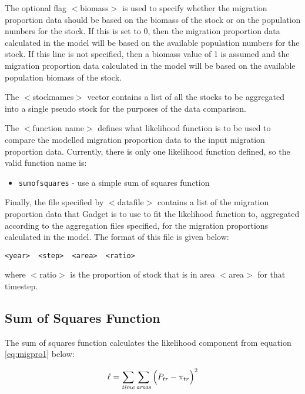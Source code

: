 \documentclass[]{book}
\providecommand{\tightlist}{%
  \setlength{\itemsep}{0pt}\setlength{\parskip}{0pt}}
\begin{document}
The optional flag \(<\)biomass\(>\) is used to specify whether the migration
proportion data should be based on the biomass of the stock or on the
population numbers for the stock. If this is set to 0, then the
migration proportion data calculated in the model will be based on the
available population numbers for the stock. If this line is not
specified, then a biomass value of 1 is assumed and the migration
proportion data calculated in the model will be based on the available
population biomass of the stock.

The \(<\)stocknames\(>\) vector contains a list of all the stocks to be
aggregated into a single pseudo stock for the purposes of the data
comparison.

The \(<\)function name\(>\) defines what likelihood function is to be used
to compare the modelled migration proportion data to the input migration
proportion data. Currently, there is only one likelihood function
defined, so the valid function name is:

\begin{itemize}
\tightlist
\item
  \texttt{sumofsquares} - use a simple sum of squares function
\end{itemize}

Finally, the file specified by \(<\)datafile\(>\) contains a list of the
migration proportion data that Gadget is to use to fit the likelihood
function to, aggregated according to the aggregation files specified,
for the migration proportions calculated in the model. The format of
this file is given below:

\begin{verbatim}
<year>  <step>  <area>  <ratio>
\end{verbatim}

where \(<\)ratio\(>\) is the proportion of stock that is in area \(<\)area\(>\)
for that timestep.

\hypertarget{sum-of-squares-function-2}{%
\subsection{Sum of Squares Function}\label{sum-of-squares-function-2}}

The sum of squares function calculates the likelihood component from
equation \eqref{eq:migpro1} below:

\begin{equation}
\label{eq:migpro1}
\ell = \sum_{\it time}\sum_{\it areas} \Big( P_{tr} - \pi_{tr} \Big) ^2\end{equation}
\end{document}
